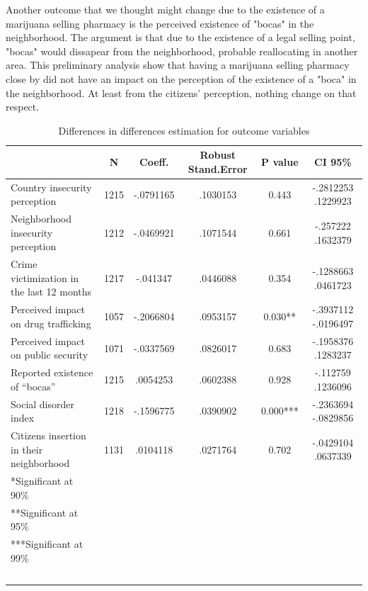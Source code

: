 \documentclass[11pt]{article}
\begin{document}
Another outcome that we thought might change due to the existence of a marijuana selling pharmacy is the perceived existence of "bocas" in the neighborhood. The argument is that due to the existence of a legal selling point, "bocas" would dissapear from the neighborhood, probable reallocating in another area. This preliminary analysis show that having a marijuana selling pharmacy close by did not have an impact on the perception of the existence of a "boca" in the neighborhood. At least from the citizens' perception, nothing change on that respect.


    \begin{scriptsize}
        \begin{table}[H]
        \tiny
        \centering
        \caption{Differences in differences estimation for outcome variables}
    \label{tab:regtab}
    \begin{tabular}{lccccc}
 & \textbf{N} & \textbf{Coeff.}	&	\textbf{Robust Stand.Error}	&	\textbf{P value}	&	\textbf{CI 95\% } 		\\	\hline
Country insecurity  perception	&	1215	&	-.0791165	&	.1030153	&	0.443	&	-.2812253    	.1229923	\\	
Neighborhood insecurity perception	&	1212	&	-.0469921	&	.1071544	&	0.661	&	-.257222    	.1632379	\\
Crime victimization in the last 12 months	&	1217	&	-.041347	&	.0446088	&	0.354	&	-.1288663  	 .0461723	\\	
Perceived impact on drug trafficking &	1057	&	-.2066804 	&	.0953157	&	0.030**	&	 -.3937112  	 -.0196497	\\	
Perceived impact on public security	&	1071	&	-.0337569 	&	.0826017 	&	0.683	&	-.1958376    	.1283237	\\
Reported existence of ``bocas''	&	1215	&	.0054253	&	.0602388	&	 0.928	&	-.112759 	.1236096	\\	
Social disorder index	&	1218	&	-.1596775 	&	.0390902 	&	0.000***	&	-.2363694 	-.0829856	\\	
Citizens insertion in their neighborhood	&	1131	&	.0104118	&	.0271764	&	0.702	&	-.0429104   	 .0637339	\\	\hline
*Significant at 90\%\\
**Significant at 95\%\\
***Significant at 99\% \\~\\
        \end{tabular}
        \end{table}
    \end{scriptsize}
\end{document}

